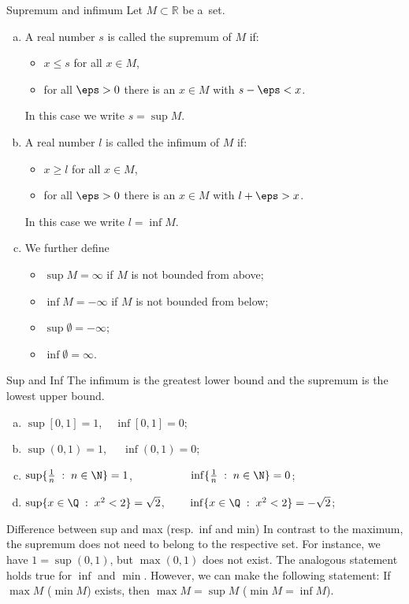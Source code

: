 \begin{Definition}{Supremum and infimum}
Let $M\subset \mathbb{R}$ be a~set.
\begin{enumerate}[(a)]
 \item  A real number $s$
 is called the supremum of $M$ if:
 	\begin{itemize}
 		\item $x\leq s$ for all $x \in M$,
 		\item for all $\eps > 0$ there is an $x \in M$ with $s-\eps < x$.
 	\end{itemize}
In this case we write $s=\sup M$.
 \item  A real number $l$
 is called the infimum of $M$ if:
 	\begin{itemize}
 		\item $x\geq l$ for all $x \in M$,
 		\item for all $\eps > 0$ there is an $x \in M$ with $l + \eps > x$.
 	\end{itemize}
In this case we write $l=\inf M$.
\item We further define
\begin{itemize}
 \item $\sup M=\infty$ if $M$ is not bounded from above;
 \item $\inf M=-\infty$ if $M$ is not bounded from below;
 \item $\sup \emptyset =-\infty$;
 \item $\inf \emptyset  =\infty$.
\end{itemize}
\end{enumerate}
\end{Definition}

\begin{Remember}{Sup and Inf}
 The infimum is the greatest lower bound and the supremum is the lowest upper bound.
\end{Remember}

\begin{example}
\begin{enumerate}[(a)]
\item $\sup[0,1]=1$, $\;\;\;\inf[0,1]=0$;
	\whiteskipsmall
\item $\sup (0,1) = 1$, $\;\;\;\;\inf (0,1) = 0$;
	\whiteskipsmall
\item $\sup\{\frac1n\;:\;n\in\N\}=1$, $\qquad\qquad\;\;\;\,\inf\{\frac1n\;:\;n\in\N\}=0$;
	\whiteskipsmall
\item $\sup\{x\in\Q\;:\;x^2<2\}=\sqrt{2}$, $\qquad\inf\{x\in\Q\;:\;x^2<2\}=-\sqrt{2}$;
\end{enumerate}
\end{example}

\begin{Remark}{Difference between sup and max (resp.\ inf and min)}
In contrast to the maximum, the supremum does not need to belong to the respective set. For instance, we have $1=\sup(0,1)$, but $\max(0,1)$ does not exist.
The analogous statement holds true for $\inf$ and $\min$. However, we can make the following statement: If $\max M$ ($\min M$) exists, then $\max M=\sup M$ ($\min M=\inf M$).
\end{Remark}
